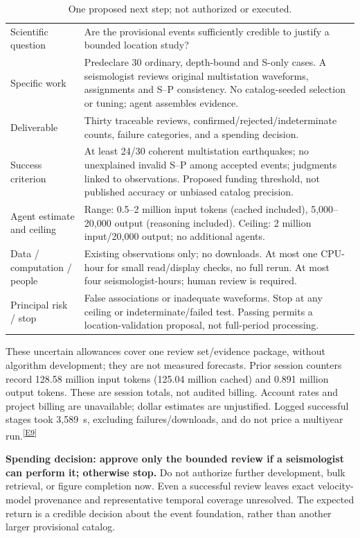 \documentclass[10pt]{article}
\newcommand{\ev}[1]{\textsuperscript{[\hyperref[app:evidence]{#1}]}}
\begin{document}
\begin{table}[H]\small
\caption{One proposed next step; not authorized or executed.}
\begin{tabular}{p{.23\linewidth}p{.71\linewidth}}
\toprule
Scientific question & Are the provisional events sufficiently credible to justify a bounded location study? \\
Specific work & Predeclare 30 ordinary, depth-bound and S-only cases. A seismologist reviews original multistation waveforms, assignments and S--P consistency. No catalog-seeded selection or tuning; agent assembles evidence. \\
Deliverable & Thirty traceable reviews, confirmed/rejected/indeterminate counts, failure categories, and a spending decision. \\
Success criterion & At least 24/30 coherent multistation earthquakes; no unexplained invalid S--P among accepted events; judgments linked to observations. Proposed funding threshold, not published accuracy or unbiased catalog precision. \\
Agent estimate and ceiling & Range: 0.5--2 million input tokens (cached included), 5,000--20,000 output (reasoning included). Ceiling: 2 million input/20,000 output; no additional agents. \\
Data / computation / people & Existing observations only; no downloads. At most one CPU-hour for small read/display checks, no full rerun. At most four seismologist-hours; human review is required. \\
Principal risk / stop & False associations or inadequate waveforms. Stop at any ceiling or indeterminate/failed test. Passing permits a location-validation proposal, not full-period processing. \\
\bottomrule
\end{tabular}
\end{table}

These uncertain allowances cover one review set/evidence package, without algorithm development; they are not measured forecasts. Prior session counters record 128.58 million input tokens (125.04 million cached) and 0.891 million output tokens. These are session totals, not audited billing. Account rates and project billing are unavailable; dollar estimates are unjustified. Logged successful stages took 3,589~s, excluding failures/downloads, and do not price a multiyear run.\ev{E9}

\textbf{Spending decision: approve only the bounded review if a seismologist can perform it; otherwise stop.} Do not authorize further development, bulk retrieval, or figure completion now. Even a successful review leaves exact velocity-model provenance and representative temporal coverage unresolved. The expected return is a credible decision about the event foundation, rather than another larger provisional catalog.
\end{document}
